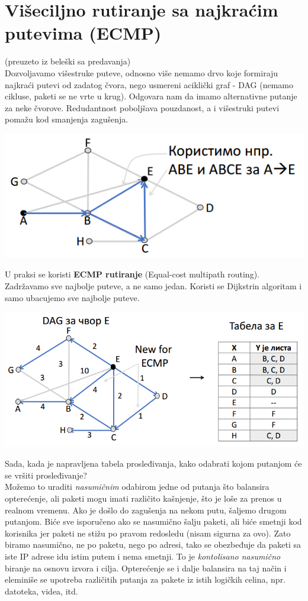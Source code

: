 \documentclass{article} %
\begin{document}
\section{Višeciljno rutiranje sa najkraćim putevima (ECMP)}
(preuzeto iz beleški sa predavanja)\\

Dozvoljavamo višestruke puteve, odnosno više nemamo drvo koje formiraju najkraći putevi od zadatog čvora, nego usmereni aciklički graf - DAG (nemamo cikluse, paketi se ne vrte u krug). Odgovara nam da imamo alternativne putanje za neke čvorove. Redudantnost poboljšava pouzdanost, a i višestruki putevi pomažu kod smanjenja zagušenja. 
\begin{center}
	\includegraphics[scale=0.5]{viseciljno}
\end{center}
U praksi se koristi \textbf{ECMP rutiranje} (Equal-cost multipath routing). Zadržavamo sve najbolje puteve, a ne samo jedan. Koristi se Dijkstrin algoritam i samo ubacujemo sve najbolje puteve.
\begin{center}
	\includegraphics[scale=0.5]{viseciljno2}
\end{center}
Sada, kada je napravljena tabela prosleđivanja, kako odabrati kojom putanjom će se vršiti prosleđivanje?\\
Možemo to uraditi \textit{nasumičnim} odabirom jedne od putanja što balansira opterećenje, ali paketi mogu imati različito kašnjenje, što je loše za prenos u realnom vremenu. Ako je došlo do zagušenja na nekom putu, šaljemo drugom putanjom. Biće sve isporučeno ako se nasumično šalju paketi, ali biće smetnji kod korisnika jer paketi ne stižu po pravom redosledu (nisam sigurna za ovo). Zato biramo nasumično, ne po paketu, nego po adresi, tako se obezbeđuje da paketi sa iste IP adrese idu istim putem i nema smetnji. To je \textit{kontolisano nasumično} biranje na osnovu izvora i cilja. Opterećenje se i dalje balansira na taj način i eleminiše se upotreba različitih putanja za pakete iz istih logičkih celina, npr. datoteka, videa, itd.
\end{document}
